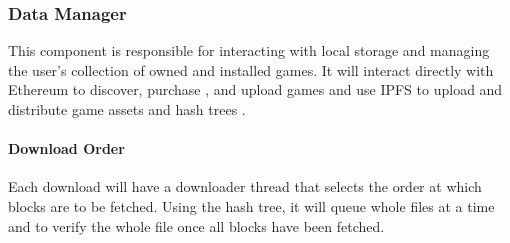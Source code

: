 \subsubsection{Data Manager}\label{subsubsec:data-manager}

This component is responsible for interacting with local storage and managing the user's collection of owned and installed games.
\x
It will interact directly with Ethereum to discover, purchase , and upload   games and use IPFS to upload and distribute game assets  and hash trees .

\paragraph*{Download Order} Each download will have a downloader thread that selects the order at which blocks are to be fetched. Using the hash tree, it will queue whole files at a time and to verify the whole file once all blocks have been fetched.



